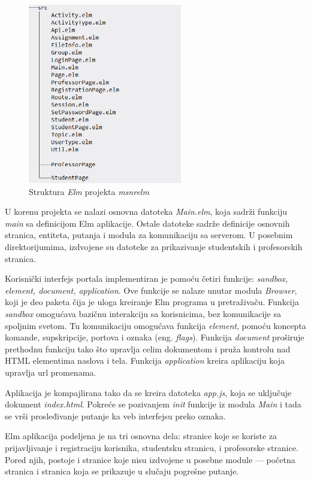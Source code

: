 \documentclass[12pt,oneside]{memoir}
\begin{document}
\begin{figure}[!ht]
  \centering
  \label{fig:msnr-elm}
  \includegraphics[width=0.6\textwidth]{msnr-elm.png}
  \caption{Struktura \emph{Elm} projekta \emph{msnr{\textunderscore}elm} \cite{rad}}
\end{figure}

\par U korenu projekta se nalazi osnovna datoteka \emph{Main.elm}, koja sadrži funkciju \emph{main} sa definicijom Elm aplikacije. Ostale datoteke sadrže definicije osnovnih stranica, entiteta, putanja i modula za komunikaciju sa serverom. U posebnim direktorijumima, izdvojene su datoteke za prikazivanje studentskih i profesorskih stranica. 
\par Korisnički interfejs portala implementiran je pomoću četiri funkcije: \emph{sandbox, element, document, application}. Ove funkcije se nalaze unutar modula \emph{Browser}, koji je deo paketa čija je uloga kreiranje Elm programa u pretraživaču. Funkcija \emph{sandbox} omogućava bazičnu interakciju sa korisnicima, bez komunikacije sa spoljnim svetom. Tu komunikaciju omogućava funkcija \emph{element}, pomoću koncepta komande, supskripcije, portova i oznaka (eng. \emph{flags}). Funkcija \emph{document} proširuje prethodnu funkciju tako što upravlja celim dokumentom i pruža kontrolu nad HTML elementima naslova i tela. Funkcija \emph{application} kreira aplikaciju koja upravlja url promenama. 
\par Aplikacija je kompajlirana tako da se kreira datoteka \emph{app.js}, koja se uključuje dokument \emph{index.html}. Pokreće se pozivanjem \emph{init} funkcije iz modula \emph{Main} i tada se vrši prosleđivanje putanje ka veb interfejsu preko oznaka. 
\par Elm aplikacija podeljena je na tri osnovna dela: stranice koje se koriste za prijavljivanje i registraciju korisnika, studentsku stranicu, i profesorske stranice. Pored njih, postoje i stranice koje nisu izdvojene u posebne module --- početna stranica i stranica koja se prikazuje u slučaju pogrešne putanje.
\end{document}
